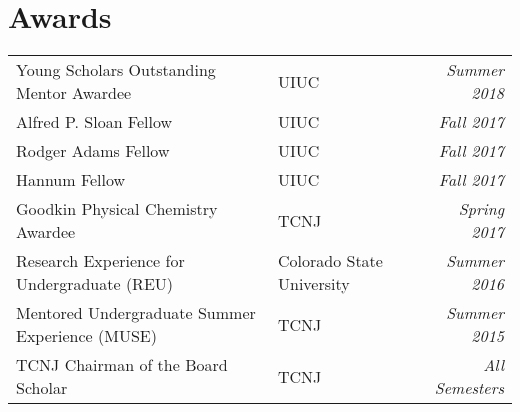 \documentclass[letterpaper,10pt]{article}
\newcommand{\sectionspace}{
\vspace{-17pt}
}
\begin{document}
\section{\textcolor{color1}{Awards}}
{
	\setlength\tabcolsep{0pt}
	\begin{tabular*}{\linewidth}{@{\extracolsep{\fill}} llr}
		Young Scholars Outstanding Mentor Awardee & UIUC & \textcolor{color2}{\textit{Summer 2018}}\\
		Alfred P. Sloan Fellow & UIUC & \textcolor{color2}{\textit{Fall 2017}}\\
		Rodger Adams Fellow & UIUC & \textcolor{color2}{\textit{Fall 2017}}\\
		Hannum Fellow & UIUC & \textcolor{color2}{\textit{Fall 2017}}\\
		Goodkin Physical Chemistry Awardee & TCNJ & \textcolor{color2}{\textit{Spring 2017}}\\
		Research Experience for Undergraduate (REU) & Colorado State University & \textcolor{color2}{\textit{Summer 2016}}\\
		Mentored Undergraduate Summer Experience (MUSE) & TCNJ & \textcolor{color2}{\textit{Summer 2015}}\\
		TCNJ Chairman of the Board Scholar & TCNJ & \textcolor{color2}{\textit{All Semesters}}\\
	\end{tabular*}
}
\sectionspace
\vspace{6pt}

\end{document}
